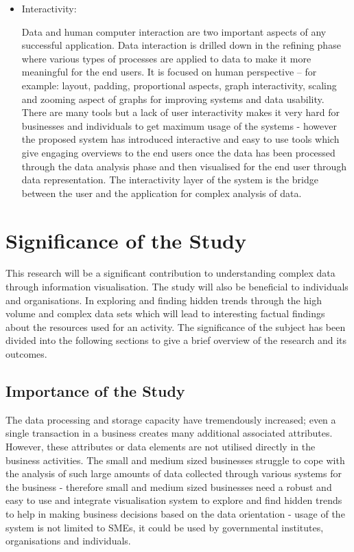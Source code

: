 \begin{itemize}
\item Interactivity:

Data and human computer interaction are two important aspects of any successful application. Data interaction is drilled down in the refining phase where various types of processes are applied to data to make it more meaningful for the end users. It is focused on human perspective – for example: layout, padding, proportional aspects, graph interactivity, scaling and zooming aspect of graphs for improving systems and data usability. There are many tools but a lack of user interactivity makes it very hard for businesses and individuals to get maximum usage of the systems - however the proposed system has introduced interactive and easy to use tools which give engaging overviews to the end users once the data has been processed through the data analysis phase and then visualised for the end user through data representation. The interactivity layer of the system is the bridge between the user and the application for complex analysis of data. 
\end{itemize}

\section{Significance of the Study}

This research will be a significant contribution to understanding complex data through information visualisation. The study will also be beneficial to individuals and organisations. In exploring and finding hidden trends through the high volume and complex data sets which will lead to interesting factual findings about the resources used for an activity. The significance of the subject has been divided into the following sections to give a brief overview of the research and its outcomes.

\subsection{Importance of the Study}

The data processing and storage capacity have tremendously increased; even a single transaction in a business creates many additional associated attributes. However, these attributes or data elements are not utilised directly in the business activities. The small and medium sized businesses struggle to cope with the analysis of such large amounts of data collected through various systems for the business - therefore small and medium sized businesses need a robust and easy to use and integrate visualisation system to explore and find hidden trends to help in making business decisions based on the data orientation - usage of the system is not limited to SMEs, it could be used by governmental institutes, organisations and individuals.

